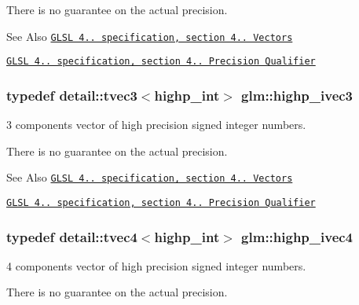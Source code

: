There is no guarantee on the actual precision.

\begin{DoxySeeAlso}{See Also}
\href{http://www.opengl.org/registry/doc/GLSLangSpec.4.20.8.pdf}{\tt G\-L\-S\-L 4.. specification, section 4.. Vectors} 

\href{http://www.opengl.org/registry/doc/GLSLangSpec.4.20.8.pdf}{\tt G\-L\-S\-L 4.. specification, section 4.. Precision Qualifier} 
\end{DoxySeeAlso}
\hypertarget{group__core__precision_ga8d03a7d21f89a6541a278bf78bb6b1fa}{
\subsubsection[{highp\-\_\-ivec3}]{\setlength{\rightskip}{0pt plus 5cm}typedef detail\-::tvec3$<$highp\-\_\-int$>$ {\bf glm\-::highp\-\_\-ivec3}}}\label{group__core__precision_ga8d03a7d21f89a6541a278bf78bb6b1fa}


3 components vector of high precision signed integer numbers. 

There is no guarantee on the actual precision.

\begin{DoxySeeAlso}{See Also}
\href{http://www.opengl.org/registry/doc/GLSLangSpec.4.20.8.pdf}{\tt G\-L\-S\-L 4.. specification, section 4.. Vectors} 

\href{http://www.opengl.org/registry/doc/GLSLangSpec.4.20.8.pdf}{\tt G\-L\-S\-L 4.. specification, section 4.. Precision Qualifier} 
\end{DoxySeeAlso}
\hypertarget{group__core__precision_ga69b5a957eb1f6a1201cd7eb9a6ac04c5}{
\subsubsection[{highp\-\_\-ivec4}]{\setlength{\rightskip}{0pt plus 5cm}typedef detail\-::tvec4$<$highp\-\_\-int$>$ {\bf glm\-::highp\-\_\-ivec4}}}\label{group__core__precision_ga69b5a957eb1f6a1201cd7eb9a6ac04c5}


4 components vector of high precision signed integer numbers. 

There is no guarantee on the actual precision.

